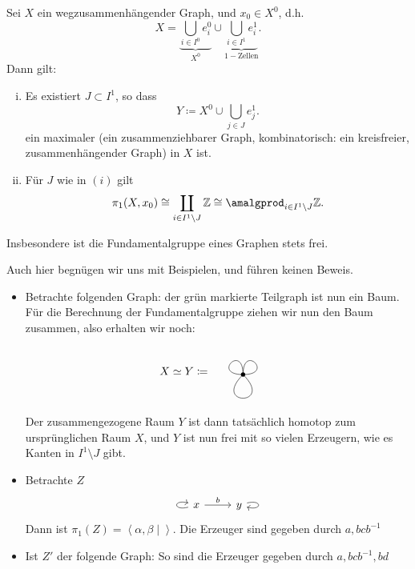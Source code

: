 \begin{theorem}[Graphen]\label{thm:fundamentalgruppe-von-graphen}
    Sei $X$ ein wegzusammenhängender Graph, und  $x_0\in X^0$, d.h.
    \[
    X = \underbrace{\bigcup_{i \in  I^0} e_i^0 }_{X^0} \cup \underbrace{\bigcup_{i \in  I^1} e_i^1
}_{1-\text{Zellen}} 
    .\]
    Dann gilt:
    \begin{enumerate}[(i)]
        \item Es existiert $J\subset I^1$, so dass
            \[
            Y \coloneqq  X^0 \cup \bigcup_{j\in J} e_j^1
            .\] 
            ein maximaler  (ein zusammenziehbarer Graph, kombinatorisch: ein kreisfreier, zusammenhängender Graph) in $X$ ist. 
        \item Für $J$ wie in  $(i)$ gilt
             \[
                 \pi_1(X,x_0) \cong \coprod_{i\in I^1 \setminus J} \mathbb{Z} \cong \amalgprod_{i\in I^1 \setminus J} \mathbb{Z}
            .\] 
    \end{enumerate}
    Insbesondere ist die Fundamentalgruppe eines Graphen stets frei.
\end{theorem}

\begin{oral}
    Auch hier begnügen wir uns mit Beispielen, und führen keinen Beweis.
\end{oral}

\begin{example}
    \begin{itemize}
        \item 
    Betrachte folgenden Graph:
    der grün markierte Teilgraph ist nun ein Baum. Für die Berechnung der Fundamentalgruppe ziehen wir nun den Baum zusammen, also erhalten wir noch:
    \[
       X \simeq Y \coloneqq 
       \begin{tikzpicture}[baseline = -0.2]
        \fill (0,0) circle (2pt);
        \draw (0,0) .. controls (1,0) and (0,1) .. (0,0);
        \draw (0,0) .. controls (0,1) and (-1,0) .. (0,0);
        \draw (0,0) .. controls (-1,-1) and (1,-1) .. (0,0);
    \end{tikzpicture}
\]
Der zusammengezogene Raum $Y$ ist dann tatsächlich homotop zum ursprünglichen Raum $X$, und  $Y$ ist nun frei mit so vielen Erzeugern, wie es Kanten in  $I^1 \setminus J$ gibt.
\item Betrachte  $Z$
    \[
    \begin{tikzcd}
        \arrow[loop left]{a} \ar{r}{b} x & y \ar[loop right]{c}
    \end{tikzcd}
\]
Dann ist $\pi_1(Z) = \left< α,β \mid  \right> $. Die Erzeuger sind gegeben durch $a, bcb^{-1}$
\item Ist $Z'$ der folgende Graph:
    So sind die Erzeuger gegeben durch $a,bc b^{-1}, bd$
    \end{itemize}
\end{example}
